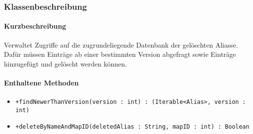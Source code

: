\subsubsection*{Klassenbeschreibung}%
\paragraph*{Kurzbeschreibung}
Verwaltet Zugriffe auf die zugrundeliegende Datenbank der gelöschten Aliasse.
Dafür müssen Einträge ab einer bestimmten Version abgefragt sowie Einträge hinzugefügt und gelöscht werden können.
\paragraph*{Enthaltene Methoden}
\begin{itemize}
    \item \texttt{+findNewerThanVersion(version : int) : (Iterable<Alias>, version : int)}
    \item \texttt{+deleteByNameAndMapID(deletedAlias : String, mapID : int) : Boolean}
\end{itemize}
